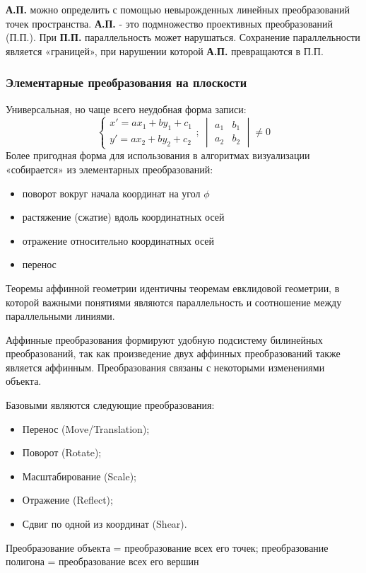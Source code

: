 \documentclass[a4paper, 14pt]{extarticle}
\begin{document}
\textbf{А.П.} можно определить с помощью невырожденных линейных преобразований точек пространства. \textbf{А.П.} - это подмножество проективных преобразований (П.П.).
При \textbf{П.П.} параллельность может нарушаться. Сохранение
параллельности является «границей», при нарушении которой \textbf{А.П.} превращаются в П.П.

\subsubsection{Элементарные преобразования на плоскости}
Универсальная, но чаще всего неудобная форма записи:
$$
\begin{cases}
	x'=ax_1+by_1+c_1\\
	y'=ax_2+by_2+c_2
\end{cases}; \ 
\begin{vmatrix}
	a_1 & b_1 \\
	a_2 & b_2
\end{vmatrix} \ne 0
$$
Более пригодная форма для использования в алгоритмах визуализации «собирается» из элементарных преобразований:
\begin{itemize}
	\item поворот вокруг начала координат на угол $\phi$
	\item растяжение (сжатие) вдоль координатных осей
	\item отражение относительно координатных осей
	\item перенос
\end{itemize}

Теоремы аффинной геометрии идентичны теоремам евклидовой геометрии, в которой важными понятиями являются параллельность и соотношение между параллельными линиями.

Аффинные преобразования формируют удобную подсистему билинейных преобразований, так как произведение двух аффинных преобразований также является аффинным. Преобразования связаны с некоторыми изменениями объекта.

Базовыми являются следующие преобразования:
\begin{itemize}
	\item Перенос (Move/Translation);
	\item Поворот (Rotate);
	\item Масштабирование (Scale);
	\item Отражение (Reflect);
	\item Сдвиг по одной из координат (Shear).
\end{itemize}
Преобразование объекта = преобразование всех его точек; преобразование полигона = преобразование всех его вершин
\end{document}

